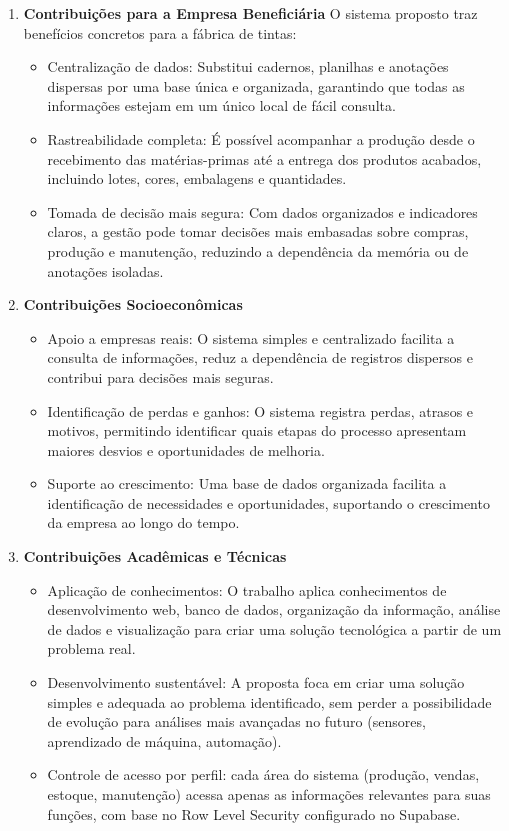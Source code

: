 \documentclass[12pt,a4paper]{article}
\begin{document}
\begin{enumerate}
\item \textbf{Contribuições para a Empresa Beneficiária}
O sistema proposto traz benefícios concretos para a fábrica de tintas:

\begin{itemize}
\item Centralização de dados: Substitui cadernos, planilhas e anotações dispersas por uma base única e organizada, garantindo que todas as informações estejam em um único local de fácil consulta.
\item Rastreabilidade completa: É possível acompanhar a produção desde o recebimento das matérias-primas até a entrega dos produtos acabados, incluindo lotes, cores, embalagens e quantidades.
\item Tomada de decisão mais segura: Com dados organizados e indicadores claros, a gestão pode tomar decisões mais embasadas sobre compras, produção e manutenção, reduzindo a dependência da memória ou de anotações isoladas.
\end{itemize}

\item \textbf{Contribuições Socioeconômicas}
\begin{itemize}
\item Apoio a empresas reais: O sistema simples e centralizado facilita a consulta de informações, reduz a dependência de registros dispersos e contribui para decisões mais seguras.
\item Identificação de perdas e ganhos: O sistema registra perdas, atrasos e motivos, permitindo identificar quais etapas do processo apresentam maiores desvios e oportunidades de melhoria.
\item Suporte ao crescimento: Uma base de dados organizada facilita a identificação de necessidades e oportunidades, suportando o crescimento da empresa ao longo do tempo.
\end{itemize}

\item \textbf{Contribuições Acadêmicas e Técnicas}
\begin{itemize}
\item Aplicação de conhecimentos: O trabalho aplica conhecimentos de desenvolvimento web, banco de dados, organização da informação, análise de dados e visualização para criar uma solução tecnológica a partir de um problema real.
\item Desenvolvimento sustentável: A proposta foca em criar uma solução simples e adequada ao problema identificado, sem perder a possibilidade de evolução para análises mais avançadas no futuro (sensores, aprendizado de máquina, automação).
\item Controle de acesso por perfil: cada área do sistema (produção, vendas, estoque, manutenção) acessa apenas as informações relevantes para suas funções, com base no Row Level Security configurado no Supabase.
\end{itemize}
\end{enumerate}
\end{document}

